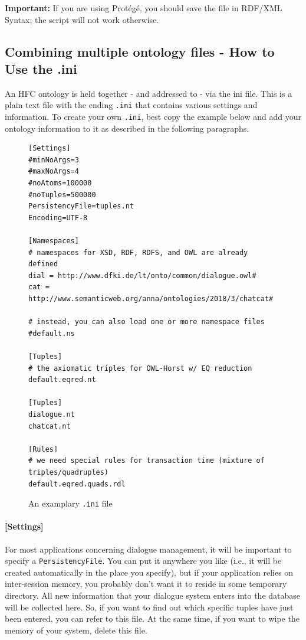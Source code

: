 \documentclass[a4paper]{report}
\begin{document}
\textbf{Important:} If you are using Prot\'eg\'e, you should save the file in
RDF/XML Syntax; the script will not work otherwise.


\subsection{Combining multiple ontology files - How to Use the .ini}

An HFC ontology is held together - and addressed to - via the ini file. This is
a plain text file with the ending \texttt{.ini} that contains various settings
and information. To create your own \texttt{.ini}, best copy the example below
and add your ontology information to it as described in the following
paragraphs.

\begin{figure} [htbp]
\begin{verbatim}
[Settings]
#minNoArgs=3
#maxNoArgs=4
#noAtoms=100000
#noTuples=500000
PersistencyFile=tuples.nt
Encoding=UTF-8

[Namespaces]
# namespaces for XSD, RDF, RDFS, and OWL are already defined
dial = http://www.dfki.de/lt/onto/common/dialogue.owl#
cat = http://www.semanticweb.org/anna/ontologies/2018/3/chatcat#

# instead, you can also load one or more namespace files
#default.ns

[Tuples]
# the axiomatic triples for OWL-Horst w/ EQ reduction
default.eqred.nt

[Tuples]
dialogue.nt
chatcat.nt

[Rules]
# we need special rules for transaction time (mixture of triples/quadruples)
default.eqred.quads.rdl
\end{verbatim}
\caption{An examplary \texttt{.ini} file}
\label{fig:ini}
\end{figure}

\paragraph{[Settings]}

For most applications concerning dialogue management, it will be important to
specify a \texttt{PersistencyFile}. You can put it anywhere you like (i.e., it
will be created automatically in the place you specify), but if your
application relies on inter-session memory, you probably don't want it to
reside in some temporary directory. All new information that your dialogue
system enters into the database will be collected here. So, if you want to find
out which specific tuples have just been entered, you can refer to this
file. At the same time, if you want to wipe the memory of your system, delete
this file.
\end{document}
